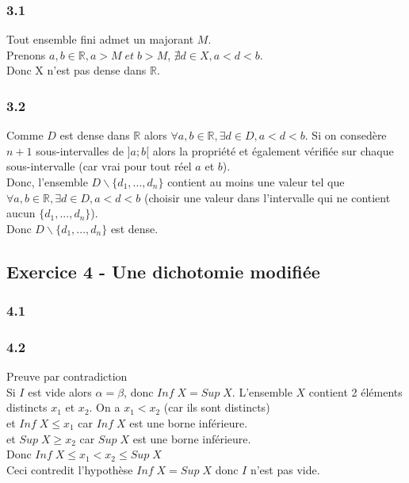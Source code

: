 \documentclass[]{book}
\theoremstyle{definition}
\newcommand{\bb}[1]{\mathbb{#1}}
\newcommand{\R}{\bb{R}}
\begin{document}
\subsubsection*{3.1}
Tout ensemble fini admet un majorant $M$.\\
Prenons $a, b \in \R, a>M\; et\; b>M$, $\nexists d \in X, a<d<b$.\\
Donc X n'est pas dense dans $\R$. 

\subsubsection*{3.2}
Comme $D$ est dense dans $\R$ alors $\forall a, b \in \R, \exists d \in D, a<d<b$. Si on consed\`ere $n+1$ sous-intervalles de $]a;b[$ alors la propri\'et\'e et \'egalement v\'erifi\'ee sur chaque sous-intervalle (car vrai pour tout r\'eel $a$ et $b$).\\
Donc, l'ensemble $D \backslash \{d_1,...,d_n\}$ contient au moins une valeur tel que $\forall a, b \in \R, \exists d \in D, a<d<b$
(choisir une valeur dans l'intervalle qui ne contient aucun $\{d_1,...,d_n\}$). \\
Donc $D \backslash \{d_1,...,d_n\}$ est dense.


\subsection*{Exercice 4 - Une dichotomie modifi\'ee}
\subsubsection*{4.1}

\subsubsection*{4.2}
Preuve par contradiction\\
Si $I$ est vide alors $\alpha=\beta$, donc $Inf\;X = Sup\; X$. L'ensemble $X$ contient 2 \'el\'ements distincts $x_1$ et $x_2$. On a $x_1 < x_2$ (car ils sont distincts)\\
et $Inf\; X \leq x_1$ car $Inf\; X$ est une borne inf\'erieure.\\
et $Sup\; X \geq x_2$ car $Sup\; X$ est une borne inf\'erieure.\\
Donc $Inf\; X \leq x_1 < x_2 \leq Sup\; X$\\

Ceci contredit l'hypoth\`ese $Inf\;X = Sup\; X$ donc $I$ n'est pas vide.
\end{document}
